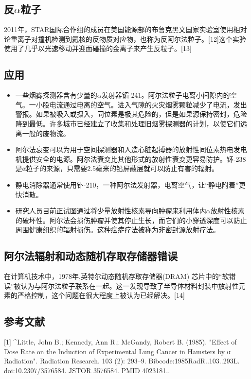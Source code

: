 \subsection{反$\alpha$粒子}
2011年，STAR国际合作组的成员在美国能源部的布鲁克黑文国家实验室使用相对论重离子对撞机检测到氦核的反物质对应物，也称为反阿尔法粒子。[12]这个实验使用了几乎以光速移动并迎面碰撞的金离子来产生反粒子。[13]

\subsection{应用}
\begin{itemize}
\item 一些烟雾探测器含有少量的$\alpha$发射器镅-241。阿尔法粒子电离小间隙内的空气。一小股电流通过电离的空气。进入气隙的火灾烟雾颗粒减少了电流，发出警报。如果被吸入或摄入，同位素是极其危险的，但是如果源保持密封，危险降到最低。许多城市已经建立了收集和处理旧烟雾探测器的计划，以使它们远离一般的废物流。
\item 阿尔法衰变可以为用于空间探测器和人造心脏起搏器的放射性同位素热电发电机提供安全的电源。阿尔法衰变比其他形式的放射性衰变更容易防护。钚-238是α粒子的来源，只需要2.5毫米的铅屏蔽层就可以防止有害的辐射。
\item 静电消除器通常使用钋-210，一种阿尔法发射器，电离空气，让“静电附着”更快消散。
\item 研究人员目前正试图通过将少量放射性核素导向肿瘤来利用体内$\alpha$放射性核素的破坏性。阿尔法会损伤肿瘤并使其停止生长，而它们的小穿透深度可以防止周围健康组织的辐射损伤。这种癌症疗法被称为非密封源放射疗法。
\end{itemize}

\subsection{阿尔法辐射和动态随机存取存储器错误}
在计算机技术中，1978年,英特尔动态随机存取存储器(DRAM) 芯片中的“软错误”被认为与阿尔法粒子联系在一起。这一发现导致了半导体材料封装中放射性元素的严格控制，这个问题在很大程度上被认为已经解决。[14]

\subsection{参考文献}
[1]
^Little, John B.; Kennedy, Ann R.; McGandy, Robert B. (1985). "Effect of Dose Rate on the Induction of Experimental Lung Cancer in Hamsters by α Radiation". Radiation Research. 103 (2): 293–9. Bibcode:1985RadR..103..293L. doi:10.2307/3576584. JSTOR 3576584. PMID 4023181..

